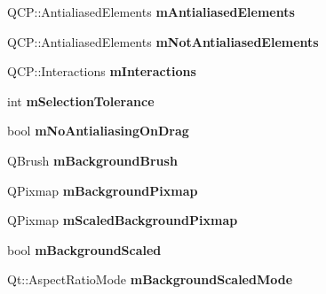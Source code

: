 \begin{DoxyCompactItemize}
\item 
Q\+C\+P\+::\+Antialiased\+Elements {\bfseries m\+Antialiased\+Elements}\hypertarget{class_q_custom_plot_aa333200629256830e273873b582a5524}{}\label{class_q_custom_plot_aa333200629256830e273873b582a5524}

\item 
Q\+C\+P\+::\+Antialiased\+Elements {\bfseries m\+Not\+Antialiased\+Elements}\hypertarget{class_q_custom_plot_a2b6ebcad00a90ba07f146cefcd4293da}{}\label{class_q_custom_plot_a2b6ebcad00a90ba07f146cefcd4293da}

\item 
Q\+C\+P\+::\+Interactions {\bfseries m\+Interactions}\hypertarget{class_q_custom_plot_ad717377ceba7493b4b32f0bcbbdf1895}{}\label{class_q_custom_plot_ad717377ceba7493b4b32f0bcbbdf1895}

\item 
int {\bfseries m\+Selection\+Tolerance}\hypertarget{class_q_custom_plot_abc36e12dd0482117ad810a800c847722}{}\label{class_q_custom_plot_abc36e12dd0482117ad810a800c847722}

\item 
bool {\bfseries m\+No\+Antialiasing\+On\+Drag}\hypertarget{class_q_custom_plot_ac83df968435f6b8ec79f2993ab9124e8}{}\label{class_q_custom_plot_ac83df968435f6b8ec79f2993ab9124e8}

\item 
Q\+Brush {\bfseries m\+Background\+Brush}\hypertarget{class_q_custom_plot_a3aef5de4ac012178e3293248e9c63737}{}\label{class_q_custom_plot_a3aef5de4ac012178e3293248e9c63737}

\item 
Q\+Pixmap {\bfseries m\+Background\+Pixmap}\hypertarget{class_q_custom_plot_ae8f4677399324a78c5f8dbfb95a34f90}{}\label{class_q_custom_plot_ae8f4677399324a78c5f8dbfb95a34f90}

\item 
Q\+Pixmap {\bfseries m\+Scaled\+Background\+Pixmap}\hypertarget{class_q_custom_plot_a081bf046501d52642dc6d7e3bdb97d57}{}\label{class_q_custom_plot_a081bf046501d52642dc6d7e3bdb97d57}

\item 
bool {\bfseries m\+Background\+Scaled}\hypertarget{class_q_custom_plot_a62fe584b20680b1b2e1c7efb5c5416a5}{}\label{class_q_custom_plot_a62fe584b20680b1b2e1c7efb5c5416a5}

\item 
Qt\+::\+Aspect\+Ratio\+Mode {\bfseries m\+Background\+Scaled\+Mode}\hypertarget{class_q_custom_plot_ab82e8a5e3ad6b486f95d6da8bf49e9aa}{}\label{class_q_custom_plot_ab82e8a5e3ad6b486f95d6da8bf49e9aa}


\end{DoxyCompactItemize}
